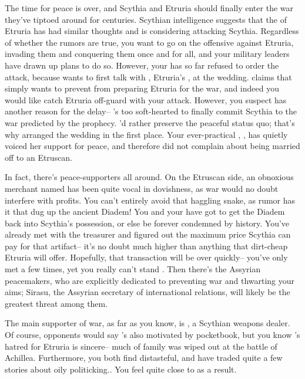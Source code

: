 \documentclass[char]{Kos}
\begin{document}
The time for peace is over, and Scythia and Etruria should finally enter the war they've tiptoed around for centuries. Scythian intelligence suggests that the \cEtruriaKing{\monarch} of Etruria has had similar thoughts and is considering attacking Scythia. Regardless of whether the rumors are true, you want to go on the offensive against Etruria, invading them and conquering them once and for all, and your military leaders have drawn up plans to do so. However, your \cScythiaKing{\spouse} has so far refused to order the attack, because \cScythiaKing{\they} wants to first talk with \cEtruriaKing{\nickname}, Etruria's \cEtruriaKing{\monarch}, at the wedding. \cScythiaKing{\They} claims that \cScythiaKing{\they} simply wants to prevent \cEtruriaKing{\nickname} from preparing Etruria for the war, and indeed you would like catch Etruria off-guard with your attack. However, you suspect \cScythiaKing{\nickname} has another reason for the delay-- \cScythiaKing{\they}'s too soft-hearted to finally commit Scythia to the war predicted by the prophecy. \cScythiaKing{\They}'d rather preserve the peaceful status quo; that's why \cScythiaKing{\they} arranged the wedding in the first place. Your ever-practical \cBride{\child}, \cBride{\nickname}, has quietly voiced her support for peace, and \cBride{\they} therefore did not complain about being married off to an Etruscan. 

In fact, there's peace-supporters all around. On the Etruscan side, an obnoxious merchant named \cMerchant{\nickname} has been quite vocal in \cMerchant{\their} dovishness, as war would no doubt interfere with \cMerchant{\their} profits. You can't entirely avoid that haggling snake, as rumor has it that \cMerchant{\they} dug up the ancient Diadem! You and your \cScythiaKing{\spouse} have got to get the Diadem back into Scythia's possession, or else be forever condemned by history. You've already met with the treasurer and figured out the maximum price Scythia can pay \cMerchant{\nickname} for that artifact-- it's no doubt much higher than anything that dirt-cheap Etruria will offer. Hopefully, that transaction will be over quickly-- you've only met \cMerchant{\nickname} a few times, yet you really can't stand \cMerchant{\them}. Then there's the Assyrian peacemakers, who are explicitly dedicated to preventing war and thwarting your aims; Sirasu, the Assyrian secretary of international relations, will likely be the greatest threat among them.

The main supporter of war, as far as you know, is \cArmsDealer{\nickname}, a Scythian weapons dealer. Of course, \cArmsDealer{\their} opponents would say \cArmsDealer{\they}'s also motivated by \cArmsDealer{\their} pocketbook, but you know \cArmsDealer{\nickname}'s hatred for Etruria is sincere-- much of \cArmsDealer{\their} family was wiped out at the battle of Achillea. Furthermore, you both find \cMerchant{\nickname} distasteful, and have traded quite a few stories about \cMerchant{\their} oily politicking.. You feel quite close to \cArmsDealer{\nickname} as a result. 
\end{document}
